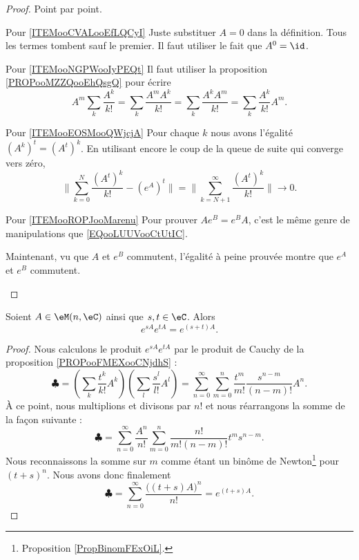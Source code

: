 \begin{proof}
	Point par point.
	\begin{subproof}
		\item[Pour \ref{ITEMooCVALooEfLQCyI}]
		Juste substituer \( A=0\) dans la définition. Tous les termes tombent sauf le premier. Il faut utiliser le fait que \( A^0=\id\).
		\item[Pour \ref{ITEMooNGPWooIyPEQt}]
		Il faut utiliser la proposition \ref{PROPooMZZQooEhQsgQ} pour écrire
		\begin{equation}        \label{EQooLUUVooCtUtIC}
			A^m\sum_k\frac{ A^k }{ k! }=\sum_k\frac{ A^mA^k }{ k! }=\sum_{k}\frac{ A^kA^m }{ k! }=\sum_k\frac{ A^k }{ k! }A^m.
		\end{equation}
		\item[Pour \ref{ITEMooEOSMooQWjcjA}]
		Pour chaque \( k\) nous avons l'égalité \( (A^k)^t=(A^t)^k\). En utilisant encore le coup de la queue de suite qui converge vers zéro,
		\begin{equation}
			\| \sum_{k=0}^N\frac{ (A^t)^k }{ k! }-( e^{A})^t \|=\| \sum_{k=N+1}^{\infty}\frac{ (A^t)^k }{ k! } \|\to 0.
		\end{equation}
		\item[Pour \ref{ITEMooROPJooMarenu}]
		Pour prouver \( A e^{B}= e^{B}A\), c'est le même genre de manipulations que \eqref{EQooLUUVooCtUtIC}.

		Maintenant, vu que \( A\) et \( e^B\) commutent, l'égalité à peine prouvée montre que \(  e^{A}\) et \(  e^{B}\) commutent.
	\end{subproof}
\end{proof}

\begin{proposition}       \label{PROPooKDKDooCUpGzE}
	Soient \( A\in \eM(n,\eC)\) ainsi que \( s,t\in \eC\). Alors
	\begin{equation}
		e^{sA} e^{tA} = e^{(s+t)A}.
	\end{equation}
\end{proposition}

\begin{proof}
	Nous calculons le produit \( e^{sA} e^{tA}\) par le produit de Cauchy de la proposition \ref{PROPooFMEXooCNjdhS} :
	\begin{equation}
		\clubsuit = \left( \sum_k\frac{ t^k }{ k! }A^k \right)\left( \sum_l\frac{ s^l }{ l! }A^l \right)=\sum_{n=0}^{\infty}\sum_{m=0}^n\frac{ t^m }{ m! }\frac{ s^{n-m} }{ (n-m)! }A^n.
	\end{equation}
	À ce point, nous multiplions et divisons par \( n!\) et nous réarrangons la somme de la façon suivante :
	\begin{equation}
		\clubsuit = \sum_{n=0}^{\infty}\frac{ A^n }{ n! }\sum_{m=0}^n\frac{ n! }{ m!(n-m)! }t^ms^{n-m}.
	\end{equation}
	Nous reconnaissons la somme sur \( m\) comme étant un binôme de Newton\footnote{Proposition \ref{PropBinomFExOiL}.} pour \( (t+s)^n\). Nous avons donc finalement
	\begin{equation}
		\clubsuit = \sum_{n=0}^{\infty}\frac{ \big( (t+s)A \big)^n }{ n! }= e^{(t+s)A}.
	\end{equation}
\end{proof}

